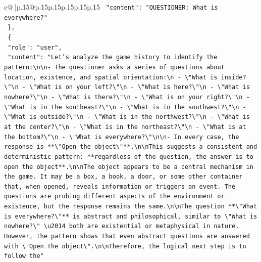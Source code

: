 \documentclass{article}
\begin{document}
{\begin{supertabular}{c@{$\;$}|p{.15\linewidth}@{}p{.15\linewidth}p{.15\linewidth}p{.15\linewidth}p{.15\linewidth}p{.15\linewidth}}
{{{\texttt{    "content": "QUESTIONER: What is everywhere?"} \\
\texttt{  \},} \\
\texttt{  \{} \\
\texttt{    "role": "user",} \\
\texttt{    "content": "Let's analyze the game history to identify the pattern:\textbackslash{}n\textbackslash{}n{-} The questioner asks a series of questions about location, existence, and spatial orientation:\textbackslash{}n  {-} \textbackslash{}"What is inside?\textbackslash{}"\textbackslash{}n  {-} \textbackslash{}"What is on your left?\textbackslash{}"\textbackslash{}n  {-} \textbackslash{}"What is here?\textbackslash{}"\textbackslash{}n  {-} \textbackslash{}"What is nowhere?\textbackslash{}"\textbackslash{}n  {-} \textbackslash{}"What is there?\textbackslash{}"\textbackslash{}n  {-} \textbackslash{}"What is on your right?\textbackslash{}"\textbackslash{}n  {-} \textbackslash{}"What is in the southeast?\textbackslash{}"\textbackslash{}n  {-} \textbackslash{}"What is in the southwest?\textbackslash{}"\textbackslash{}n  {-} \textbackslash{}"What is outside?\textbackslash{}"\textbackslash{}n  {-} \textbackslash{}"What is in the northwest?\textbackslash{}"\textbackslash{}n  {-} \textbackslash{}"What is at the center?\textbackslash{}"\textbackslash{}n  {-} \textbackslash{}"What is in the northeast?\textbackslash{}"\textbackslash{}n  {-} \textbackslash{}"What is at the bottom?\textbackslash{}"\textbackslash{}n  {-} \textbackslash{}"What is everywhere?\textbackslash{}"\textbackslash{}n\textbackslash{}n{-} In every case, the response is **\textbackslash{}"Open the object\textbackslash{}"**.\textbackslash{}n\textbackslash{}nThis suggests a consistent and deterministic pattern: **regardless of the question, the answer is to open the object**.\textbackslash{}n\textbackslash{}nThe object appears to be a central mechanism in the game. It may be a box, a book, a door, or some other container that, when opened, reveals information or triggers an event. The questions are probing different aspects of the environment or existence, but the response remains the same.\textbackslash{}n\textbackslash{}nThe question **\textbackslash{}"What is everywhere?\textbackslash{}"** is abstract and philosophical, similar to \textbackslash{}"What is nowhere?\textbackslash{}" \textbackslash{}u2014 both are existential or metaphysical in nature. However, the pattern shows that even abstract questions are answered with \textbackslash{}"Open the object\textbackslash{}".\textbackslash{}n\textbackslash{}nTherefore, the logical next step is to follow the"} \\
}}}
\end{supertabular}}
\end{document}
